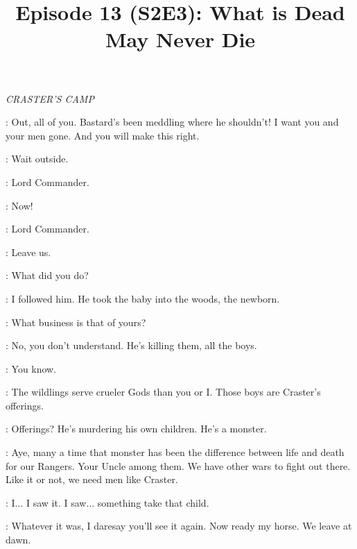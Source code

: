 

\title{Episode 13 (S2E3): What is Dead May Never Die}
\author{}
\date{}
\maketitle




\scene

\textit{CRASTER'S CAMP} 


\CRASTER: Out, all of you. Bastard's been meddling where he shouldn't! I want you and your men gone. And you will make this right. 

\JEOR:  Wait outside. 

\JON: Lord Commander. 

\JEOR: Now! 


\JON: Lord Commander. 

\JEOR: Leave us. 


\JEOR: What did you do? 

\JON: I followed him. He took the baby into the woods, the newborn. 

\JEOR: What business is that of yours? 

\JON: No, you don't understand. He's killing them, all the boys. 


\JON: You know. 

\JEOR: The wildlings serve crueler Gods than you or I. Those boys are Craster's offerings. 

\JON: Offerings? He's murdering his own children. He's a monster. 

\JEOR: Aye, many a time that monster has been the difference between life and death for our Rangers. Your Uncle among them. We have other wars to fight out there. Like it or not, we need men like Craster. 

\JON: I$\ldots$ I saw it. I saw$\ldots$ something take that child. 


\JEOR: Whatever it was, I daresay you'll see it again. Now ready my horse. We leave at dawn. 


